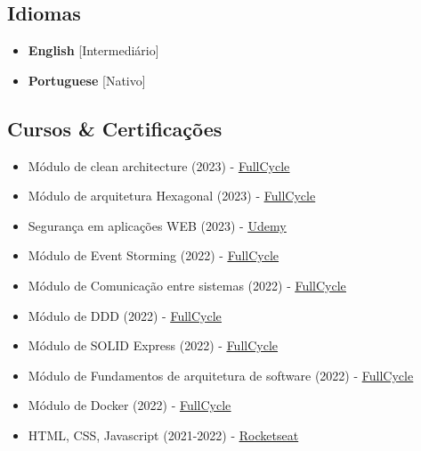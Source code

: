 \documentclass[11pt,a4paper,sans]{moderncv}
\begin{document}
\begin{samepage}
	\section{Idiomas}
	\begin{multicols}{2}
		\begin{itemize}[label=\textbullet]
			\item \textbf{English} [Intermediário]
			\item \textbf{Portuguese} [Nativo]
		\end{itemize}
	\end{multicols}
\end{samepage}
\vspace{\baselineskip}

\begin{samepage}
	\section{Cursos \& Certificações}
	 {\begin{itemize}[itemsep=0cm, label=\textbullet]
		  \item Módulo de clean architecture (2023) - \underline{\color{blue}\href{https://fullcycle.com}{FullCycle}}
		  \item Módulo de arquitetura Hexagonal (2023) - \underline{\color{blue}\href{https://fullcycle.com}{FullCycle}}
		  \item Segurança em aplicações WEB (2023) - \underline{\color{blue}\href{https://udemy.com}{Udemy}}
		  \item Módulo de Event Storming (2022) - \underline{\color{blue}\href{https://fullcycle.com}{FullCycle}}
		  \item Módulo de Comunicação entre sistemas (2022) - \underline{\color{blue}\href{https://fullcycle.com}{FullCycle}}
		  \item Módulo de DDD (2022) - \underline{\color{blue}\href{https://fullcycle.com}{FullCycle}}
		  \item Módulo de SOLID Express (2022) - \underline{\color{blue}\href{https://fullcycle.com}{FullCycle}}
		  \item Módulo de Fundamentos de arquitetura de software (2022) - \underline{\color{blue}\href{https://fullcycle.com}{FullCycle}}
		  \item Módulo de Docker (2022) - \underline{\color{blue}\href{https://fullcycle.com}{FullCycle}}
		  \item HTML, CSS, Javascript (2021-2022) - \underline{\color{blue}\href{https://rocketseat.com.br}{Rocketseat}}

\end{itemize}}
\end{samepage}
\end{document}
